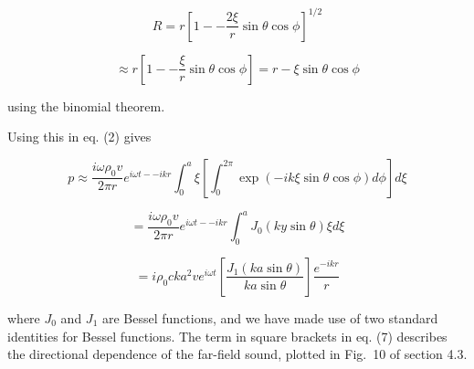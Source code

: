   $$R = r \left[ 1 -- \dfrac{2\xi}{r} \sin \theta \cos \phi \right]^{1/2}$$ 

  $$\approx r \left[ 1 -- \dfrac{\xi}{r} \sin \theta \cos \phi \right]=r-\xi 
  \sin \theta \cos \phi \tag{4}$$ 

  using the binomial theorem. 

  Using this in eq. (2) gives 

  $$p\approx \dfrac{i \omega \rho_0 v}{2 \pi r} e^{i \omega t -- ikr} 
  \int_0^a{\xi \left[ \int_0^{2 \pi}{\exp(-ik\xi \sin \theta \cos \phi) d \phi} 
  \right] d\xi} \tag{5}$$ 

  $$=\dfrac{i \omega \rho_0 v}{2 \pi r} e^{i \omega t -- ikr} \int_0^a{J_0(ky 
  \sin \theta) \xi d\xi} \tag{6}$$ 

  $$= i \rho_0 c k a^2 v e^{i \omega t} \left[ \dfrac{J_1(ka \sin \theta)}{ka 
  \sin \theta} \right] \dfrac{e^{-ikr}}{r} \tag{7}$$ 

  where $J_0$ and $J_1$ are Bessel functions, and we have made use of two 
  standard identities for Bessel functions. The term in square brackets in eq. 
  (7) describes the directional dependence of the far-field sound, plotted in 
  Fig.\ 10 of section 4.3. 